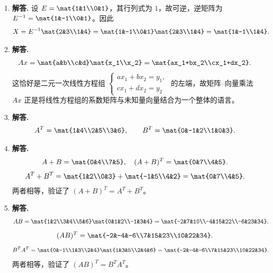\begin{enumerate}[label=\textbf{\arabic*.}, leftmargin=*, itemsep=1em]
  \item \textbf{解答.}
  设 $E = \mat{1&1\\0&1}$，其行列式为 $1$，故可逆，逆矩阵为 $E^{-1}=\mat{1&-1\\0&1}$。因此
  \[
    X = E^{-1}\mat{2&3\\1&4}
      = \mat{1&-1\\0&1}\mat{2&3\\1&4}
      = \mat{1&-1\\1&4}.
  \]

  \item \textbf{解答.}
  \[
    Ax = \mat{a&b\\c&d}\mat{x_1\\x_2} = \mat{ax_1+bx_2\\cx_1+dx_2}.
  \]
  这恰好是二元一次线性方程组
  $\begin{cases}ax_1+bx_2=y_1,\\cx_1+dx_2=y_2\end{cases}$
  的左端，故矩阵–向量乘法 $Ax$ 正是将线性方程组的系数矩阵与未知量向量结合为一个整体的语言。

  \item \textbf{解答.}
  \[
    A^T = \mat{1&4\\2&5\\3&6},\qquad B^T = \mat{0&-1&2\\1&0&3}.
  \]

  \item \textbf{解答.}
  \[
    A+B = \mat{0&4\\7&5},\quad (A+B)^T = \mat{0&7\\4&5}.
  \]
  \[
    A^T+B^T = \mat{1&2\\0&3}+\mat{-1&5\\4&2} = \mat{0&7\\4&5}.
  \]
  两者相等，验证了 $(A+B)^T=A^T+B^T$。

  \item \textbf{解答.}
  \[
    AB = \mat{1&2\\3&4\\5&6}\mat{0&1&2\\-1&3&4}
       = \mat{-2&7&10\\-4&15&22\\-6&23&34}.
  \]
  \[
    (AB)^T = \mat{-2&-4&-6\\7&15&23\\10&22&34}.
  \]
  \[
    B^TA^T = \mat{0&-1\\1&3\\2&4}\mat{1&3&5\\2&4&6}
           = \mat{-2&-4&-6\\7&15&23\\10&22&34}.
  \]
  两者相等，验证了 $(AB)^T=B^TA^T$。


\end{enumerate}
